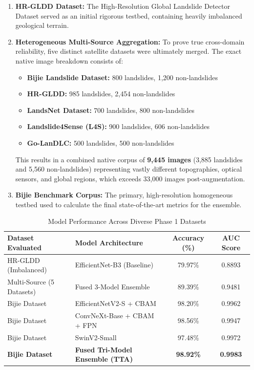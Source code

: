 \documentclass[11pt,a4paper]{article}
\begin{document}
\begin{enumerate}
    \item \textbf{HR-GLDD Dataset:} The High-Resolution Global Landslide Detector Dataset served as an initial rigorous testbed, containing heavily imbalanced geological terrain.
    \item \textbf{Heterogeneous Multi-Source Aggregation:} To prove true cross-domain reliability, five distinct satellite datasets were ultimately merged. The exact native image breakdown consists of:
    \begin{itemize}
        \item \textbf{Bijie Landslide Dataset:} 800 landslides, 1,200 non-landslides
        \item \textbf{HR-GLDD:} 985 landslides, 2,454 non-landslides
        \item \textbf{LandsNet Dataset:} 700 landslides, 800 non-landslides
        \item \textbf{Landslide4Sense (L4S):} 900 landslides, 606 non-landslides
        \item \textbf{Go-LanDLC:} 500 landslides, 500 non-landslides
    \end{itemize}
    This results in a combined native corpus of \textbf{9,445 images} (3,885 landslides and 5,560 non-landslides) representing vastly different topographies, optical sensors, and global regions, which exceeds 33,000 images post-augmentation.
    \item \textbf{Bijie Benchmark Corpus:} The primary, high-resolution homogeneous testbed used to calculate the final state-of-the-art metrics for the ensemble.
\end{enumerate}

\begin{table}[H]
\centering
\caption{Model Performance Across Diverse Phase 1 Datasets}
\begin{tabular}{llcc}
\toprule
\textbf{Dataset Evaluated} & \textbf{Model Architecture} & \textbf{Accuracy (\%)} & \textbf{AUC Score} \\
\midrule
HR-GLDD (Imbalanced) & EfficientNet-B3 (Baseline) & 79.97\% & 0.8893 \\
Multi-Source (5 Datasets) & Fused 3-Model Ensemble & 89.39\% & 0.9481 \\
\midrule
Bijie Dataset & EfficientNetV2-S + CBAM & 98.20\% & 0.9962 \\
Bijie Dataset & ConvNeXt-Base + CBAM + FPN & 98.56\% & 0.9947 \\
Bijie Dataset & SwinV2-Small & 97.48\% & 0.9972 \\
\textbf{Bijie Dataset} & \textbf{Fused Tri-Model Ensemble (TTA)} & \textbf{98.92\%} & \textbf{0.9983} \\
\bottomrule
\end{tabular}
\end{table}
\end{document}
